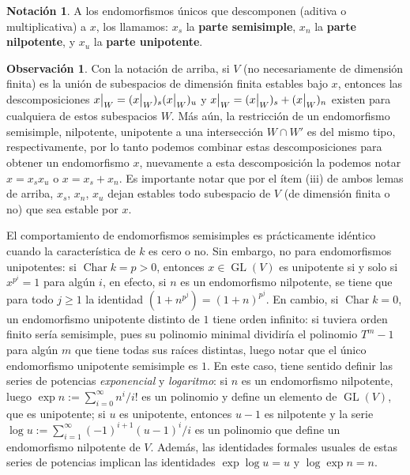 \documentclass[spanish,12pt]{amsart}
\theoremstyle{definition}
\newtheorem{obs}[theorem]{Observación}
\newtheorem{notation}[theorem]{Notación}
\theoremstyle{remark}
\numberwithin{equation}{section}
\newcommand\rest[2]{{%
  \left.\kern-\nulldelimiterspace %
  #1 %
  \vphantom{\big|} %
  \right|_{#2} %
  }}
\newcommand{\Char}[1]{\operatorname{Char} #1}
\begin{document}
\begin{notation}
A los endomorfismos únicos que descomponen (aditiva o multiplicativa) a $x$, los llamamos: $x_s$ la \textbf{parte semisimple}, $x_n$ la \textbf{parte nilpotente}, y $x_u$ la \textbf{parte unipotente}.
\end{notation}

\begin{obs}
Con la notación de arriba, si $V$ (no necesariamente de dimensión finita) es la unión de subespacios de dimensión finita estables bajo $x$, entonces las descomposiciones $\rest x W = (\rest x  W)_s (\rest x  W)_u$ y $\rest x W = (\rest x  W)_s + (\rest x W)_n$ existen para cualquiera de estos subespacios $W$. Más aún, la restricción de un endomorfismo semisimple, nilpotente, unipotente a una intersección $W \cap W'$ es del mismo tipo, respectivamente, por lo tanto podemos combinar estas descomposiciones para obtener un endomorfismo $x$, nuevamente a esta descomposición la podemos notar $x = x_s x_u$ o $x = x_s + x_n$. Es importante notar que por el ítem (iii) de ambos lemas de arriba, $x_s$, $x_n$, $x_u$ dejan estables todo subespacio de $V$ (de dimensión finita o no) que sea estable por $x$.
\end{obs}

El comportamiento de endomorfismos semisimples es prácticamente idéntico cuando la característica de $k$ es cero o no. Sin embargo, no para endomorfismos unipotentes: si $\Char k = p > 0$, entonces $x \in \operatorname{GL} (V)$ es unipotente si y solo si $x^{p^i} = 1$ para algún $i$, en efecto, si $n$ es un endomorfismo nilpotente, se tiene que para todo $j \geq 1$ la identidad $(1+n^{p^j}) = (1 + n)^{p^j}$. En cambio, si $\Char k = 0$,  un endomorfismo unipotente distinto de $1$ tiene orden infinito: si tuviera orden finito sería semisimple, pues su polinomio minimal dividiría el polinomio $T^m - 1$ para algún $m$ que tiene todas sus raíces distintas, luego notar que el único endomorfismo unipotente semisimple es $1$. En este caso, tiene sentido definir las series de potencias \textit{exponencial} y \textit{logaritmo}: si $n$ es un endomorfismo nilpotente, luego $\exp n := \sum_{i = 0}^\infty n^i /i!$ es un polinomio y define un elemento de $\operatorname{GL}(V)$, que es unipotente; si $u$ es unipotente, entonces $u-1$ es nilpotente y la serie $\log u := \sum_{i = 1}^\infty (-1)^{i + 1} (u - 1)^i / i$ es un polinomio que define un endomorfismo nilpotente de $V$. Además, las identidades formales usuales de estas series de potencias implican las identidades $\exp \log u = u$ y $\log \exp n = n$.
\end{document}
